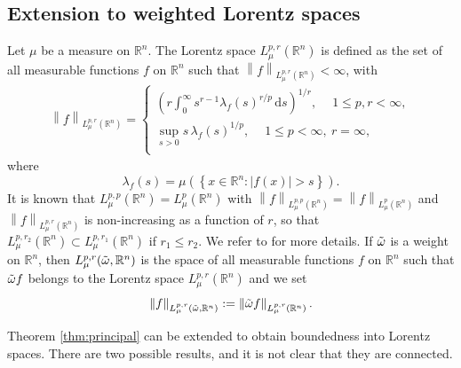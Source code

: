\documentclass[12pt, letterpaper]{amsart}
\theoremstyle{definition}
\theoremstyle{remark}
\numberwithin{equation}{section}
\begin{document}
{\subsection{Extension to weighted Lorentz spaces}\label{sub:Lorentz}
Let $\mu$ be a measure on $\mathbb{R}^n$. The Lorentz space $L^{p,r}_{\mu}(\mathbb{R}^n)$ is defined as the set of all measurable functions $f$ on $\mathbb{R}^n$ such that $\left\| f\right\|_{L^{p,r}_{\mu}(\mathbb{R}^n)} < \infty$, with
\begin{align*}
\left\| f\right\|_{L^{p,r}_{\mu}(\mathbb{R}^n)} =\left\{\begin{matrix}
\left (r \int_{0}^{\infty} s^{r-1} \lambda_f(s)^{r/p} \, \mathrm{d}s \right )^{1/r}, \quad \ 1\leq p,r <\infty , \\ 
 \sup_{s>0} s \, \lambda_f(s)^{1/p}, \quad \ 1\le p < \infty, \ r=\infty,
 \\ 
 \end{matrix}\right. 
 \end{align*}
 where 
$$ \lambda_f(s)=\mu\left ( \left\{ x\in \mathbb{R}^n : |f(x)|>s\right\} \right )
. 
$$
It is known that $L^{p,p}_{\mu}(\mathbb{R}^n)=L^{p}_{\mu}(\mathbb{R}^n)$ with $\left\| f\right\|_{L^{p,p}_{\mu}(\mathbb{R}^n)}=\left\| f\right\|_{L^{p}_{\mu}(\mathbb{R}^n)}$ and $\left\| f\right\|_{L^{p,r}_{\mu}(\mathbb{R}^n)}$ is non-increasing as a function of $r$, so that $L^{p,r_2}_{\mu}(\mathbb{R}^n)%
\subset L^{p,r_1}_{\mu}(\mathbb{R}^n)$ if $r_1 \leq r_2$. We refer to \cite[Ch. V, \S3 ]{stein1971introduction} for more details. If $\Tilde{\omega}$ is a weight on $\mathbb{R}^n$, then $L^{p,r}_{\mu}(\Tilde{\omega}, \mathbb{R}^n)$ is the space of all measurable functions $f$ on $\mathbb{R}^n$ such that $\Tilde{\omega}f$ belongs to the Lorentz space $L^{p,r}_{\mu}(\mathbb{R}^n)$ and we set 
\begin{equation*}
  \left\| f \right\|_{L^{p,r}_{\mu}(\Tilde{\omega}, \mathbb{R}^n)} :=  \left\| \Tilde{\omega}f \right\|_{L^{p,r}_{\mu}(\mathbb{R}^n)}.
\end{equation*}

Theorem \ref{thm:principal}  can be extended to obtain boundedness into Lorentz spaces. There are two possible results, and it is not clear that they are connected.   

}
\end{document}
